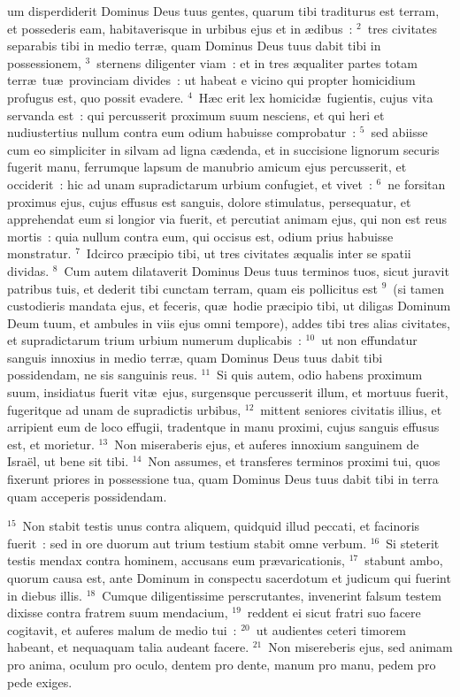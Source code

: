 \bchapter
{}um disperdiderit Dominus Deus tuus gentes, quarum tibi traditurus est terram, et possederis eam, habitaverisque in urbibus ejus et in \ae dibus~:
${}^{2}$~tres civitates separabis tibi in medio terr\ae , quam Dominus Deus tuus dabit tibi in possessionem,
${}^{3}$~sternens diligenter viam~: et in tres \ae qualiter partes totam terr\ae\ tu\ae\ provinciam divides~: ut habeat e vicino qui propter homicidium profugus est, quo possit evadere.
${}^{4}$~H\ae c erit lex homicid\ae\ fugientis, cujus vita servanda est~: qui percusserit proximum suum nesciens, et qui heri et nudiustertius nullum contra eum odium habuisse comprobatur~:
${}^{5}$~sed abiisse cum eo simpliciter in silvam ad ligna c\ae denda, et in succisione lignorum securis fugerit manu, ferrumque lapsum de manubrio amicum ejus percusserit, et occiderit~: hic ad unam supradictarum urbium confugiet, et vivet~:
${}^{6}$~ne forsitan proximus ejus, cujus effusus est sanguis, dolore stimulatus, persequatur, et apprehendat eum si longior via fuerit, et percutiat animam ejus, qui non est reus mortis~: quia nullum contra eum, qui occisus est, odium prius habuisse monstratur.
${}^{7}$~Idcirco pr\ae cipio tibi, ut tres civitates \ae qualis inter se spatii dividas.
${}^{8}$~Cum autem dilataverit Dominus Deus tuus terminos tuos, sicut juravit patribus tuis, et dederit tibi cunctam terram, quam eis pollicitus est
${}^{9}$~(si tamen custodieris mandata ejus, et feceris, qu\ae\ hodie pr\ae cipio tibi, ut diligas Dominum Deum tuum, et ambules in viis ejus omni tempore), addes tibi tres alias civitates, et supradictarum trium urbium numerum duplicabis~:
${}^{10}$~ut non effundatur sanguis innoxius in medio terr\ae , quam Dominus Deus tuus dabit tibi possidendam, ne sis sanguinis reus.
${}^{11}$~Si quis autem, odio habens proximum suum, insidiatus fuerit vit\ae\ ejus, surgensque percusserit illum, et mortuus fuerit, fugeritque ad unam de supradictis urbibus,
${}^{12}$~mittent seniores civitatis illius, et arripient eum de loco effugii, tradentque in manu proximi, cujus sanguis effusus est, et morietur.
${}^{13}$~Non miseraberis ejus, et auferes innoxium sanguinem de Isra\"el, ut bene sit tibi.
${}^{14}$~Non assumes, et transferes terminos proximi tui, quos fixerunt priores in possessione tua, quam Dominus Deus tuus dabit tibi in terra quam acceperis possidendam.


${}^{15}$~Non stabit testis unus contra aliquem, quidquid illud peccati, et facinoris fuerit~: sed in ore duorum aut trium testium stabit omne verbum.
${}^{16}$~Si steterit testis mendax contra hominem, accusans eum pr\ae varicationis,
${}^{17}$~stabunt ambo, quorum causa est, ante Dominum in conspectu sacerdotum et judicum qui fuerint in diebus illis.
${}^{18}$~Cumque diligentissime perscrutantes, invenerint falsum testem dixisse contra fratrem suum mendacium,
${}^{19}$~reddent ei sicut fratri suo facere cogitavit, et auferes malum de medio tui~:
${}^{20}$~ut audientes ceteri timorem habeant, et nequaquam talia audeant facere.
${}^{21}$~Non misereberis ejus, sed animam pro anima, oculum pro oculo, dentem pro dente, manum pro manu, pedem pro pede exiges.

